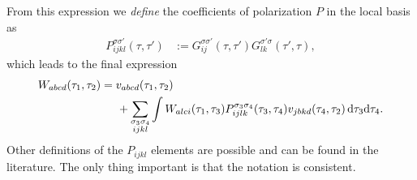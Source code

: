 \documentclass[12pt,a4paper]{scrartcl}
\numberwithin{equation}{section}
\begin{document}
From this expression we \textit{define} the coefficients of  polarization $P$ in
the local basis as
\begin{align}
 P^{\sigma\sigma'}_{ijkl}(\tau,\tau') 
 &:= G^{\sigma\sigma'}_{ij}(\tau,\tau') G^{\sigma'\sigma}_{lk}(\tau',\tau),
\end{align}
which leads to the final expression
\begin{align}
W_{abcd}(\tau_1,\tau_2) 
%
&= v_{abcd}(\tau_1,\tau_2)  \nonumber \\ 
& \hspace{0.5cm}  + \sum_{\substack{\sigma_3\sigma_4 \\ ijkl }}\int 
                     W_{alci}(\tau_1,\tau_3) 
                     P^{\sigma_3\sigma_4}_{ijlk}(\tau_3,\tau_4) 
                     v_{jbkd}(\tau_4,\tau_2)
                    \, \mathrm{d}\tau_3\mathrm{d}\tau_4 .
%
\end{align}
Other definitions of the $P_{ijkl}$ elements are possible and can be found in the literature.
The only thing important is that the notation is consistent.


\end{document}

